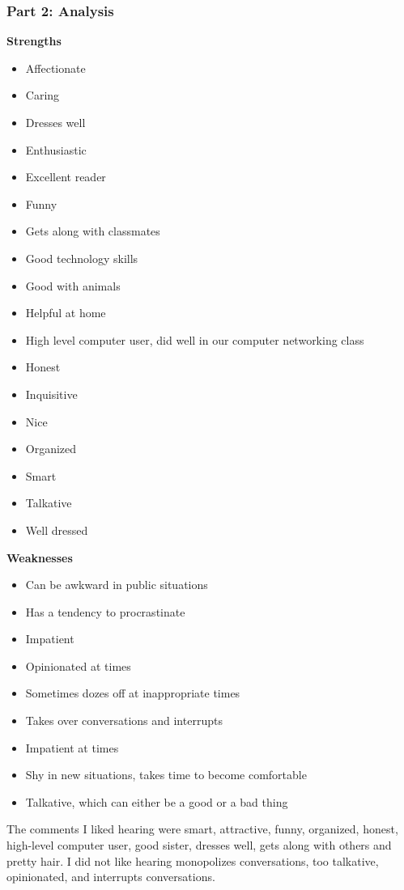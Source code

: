 \subsubsection*{Part 2: Analysis}
\textbf{Strengths}
\begin{itemize}[leftmargin=*]
\item Affectionate
\item Caring
\item Dresses well
\item Enthusiastic
\item Excellent reader
\item Funny
\item Gets along with classmates
\item Good technology skills
\item Good with animals
\item Helpful at home
\item High level computer user, did well in our computer networking class
\item Honest
\item Inquisitive
\item Nice
\item Organized
\item Smart
\item Talkative
\item Well dressed
\end{itemize}
\textbf{Weaknesses}
\begin{itemize}[leftmargin=*]
\item Can be awkward in public situations
\item Has a tendency to procrastinate
\item Impatient
\item Opinionated at times
\item Sometimes dozes off at inappropriate times
\item Takes over conversations and interrupts
\item Impatient at times
\item Shy in new situations, takes time to become comfortable
\item Talkative, which can either be a good or a bad thing
\end{itemize}
The comments I liked hearing were smart, attractive, funny, organized, honest, high-level computer user, good sister, dresses well, gets along with others and pretty hair. I did not like hearing monopolizes conversations, too talkative, opinionated, and interrupts conversations.

